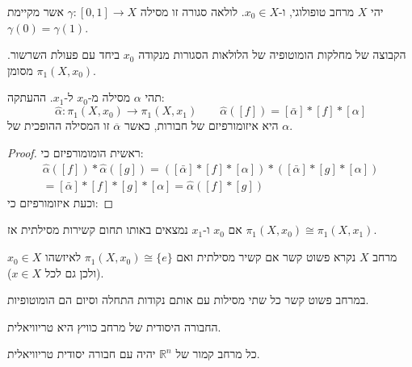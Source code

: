 \documentclass{tstextbook}
\begin{document}
\begin{definition}
יהי \(X\) מרחב טופולוגי, ו-\(x_{0} \in X\). לולאה סגורה זו מסילה \(\gamma:[0,1]\to X\) אשר מקיימת \(\gamma(0)=\gamma(1)\).

\end{definition}
\begin{definition}
הקבוצה של מחלקות הומוטופיה של הלולאות הסגורות מנקודה \(x_{0}\) ביחד עם פעולת השרשור. מסומן \(\pi_{1}(X,x_{0})\).

\end{definition}
\begin{proposition}
תהי \(\alpha\) מסילה מ-\(x_{0}\) ל-\(x_{1}\). ההעתקה:
$$\hat{\alpha}:\pi_{1}(X,x_{0})\longrightarrow\pi_{1}(X,x_{1})\qquad \hat{\alpha}([f])=[\bar{\alpha}]*[f]*[\alpha]$$
היא איזומורפיזם של חבורות, כאשר \(\overline{\alpha}\) זו המסילה ההופכית של \(\alpha\).

\end{proposition}
\begin{proof}
ראשית הומומורפיזם כי:
\begin{gather*}\hat{\alpha}([f])*\hat{\alpha}([g])=\left( \left[ \bar{\alpha} \right]*[f]*\left[ \alpha \right] \right)*\left( \left[ \bar{\alpha} \right]*[g]*\left[ \alpha \right] \right)  \\=[\bar{\alpha}]\ast[f]\ast[g]\ast[\alpha]={\hat{\alpha}}([f]\ast[g])
\end{gather*}
וכעת איזומורפיזם כי:

\end{proof}
\begin{corollary}
אם \(x_{0}\) ו-\(x_{1}\) נמצאים באותו תחום קשירות מסילתית אז  \(\pi_{1}(X,x_{0})\cong \pi_{1}(X,x_{1})\).

\end{corollary}
\begin{definition}
מרחב \(X\) נקרא פשוט קשר אם קשיר מסילתית ואם \(\pi_{1}(X,x_{0})\cong\{ e \}\) לאיזשהו \(x_{0} \in X\)(ולכן גם לכל \(x \in X\)).

\end{definition}
\begin{proposition}
במרחב פשוט קשר כל שתי מסילות עם אותם נקודות התחלה וסיום הם הומוטופיות.

\end{proposition}
\begin{proposition}
החבורה היסודית של מרחב כוויץ היא טריוויאלית.

\end{proposition}
\begin{corollary}
כל מרחב קמור של \(\mathbb{R}^{n}\) יהיה עם חבורה יסודית טריוויאלית.

\end{corollary}
\end{document}
